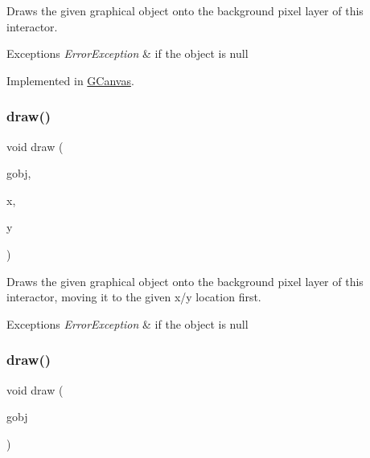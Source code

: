 Draws the given graphical object onto the background pixel layer of this interactor. 


\begin{DoxyExceptions}{Exceptions}
{\em Error\+Exception} & if the object is null \\
\hline
\end{DoxyExceptions}


Implemented in \mbox{\hyperlink{classGCanvas_a7f7f6c1798bcedfd52151b458074e8a0}{G\+Canvas}}.

\mbox{\label{classGDrawingSurface_acc3825d7a24815d1e2f78e7c3ffea6cc}} 
\subsubsection{\texorpdfstring{draw()}{draw()}\hspace{0.1cm}{\footnotesize\ttfamily [2/4]}}
{\footnotesize\ttfamily void draw (\begin{DoxyParamCaption}\item[{\mbox{\hyperlink{classGObject}{G\+Object}} $\ast$}]{gobj,  }\item[{double}]{x,  }\item[{double}]{y }\end{DoxyParamCaption})\hspace{0.3cm}{\ttfamily [virtual]}}



Draws the given graphical object onto the background pixel layer of this interactor, moving it to the given x/y location first. 


\begin{DoxyExceptions}{Exceptions}
{\em Error\+Exception} & if the object is null \\
\hline
\end{DoxyExceptions}
\mbox{\label{classGDrawingSurface_a022a8d51c7fabcd79a0c809233e93453}} 
\subsubsection{\texorpdfstring{draw()}{draw()}\hspace{0.1cm}{\footnotesize\ttfamily [3/4]}}
{\footnotesize\ttfamily void draw (\begin{DoxyParamCaption}\item[{\mbox{\hyperlink{classGObject}{G\+Object}} \&}]{gobj }\end{DoxyParamCaption})\hspace{0.3cm}{\ttfamily [virtual]}}



